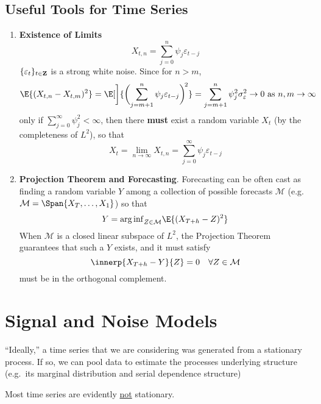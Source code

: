 \subsection*{Useful Tools for Time Series}
\begin{enumerate}[(1)]
    \item \textbf{Existence of Limits}
          \[ X_{t,n}=\sum_{j=0}^{n} \psi_j \varepsilon_{t-j}
          \]
          $ \{\varepsilon_t\}_{t\in\mathbf{Z}} $ is a strong white noise.
          Since for $ n>m $,
          \[ \E{(X_{t,n}-X_{t,m})^2}
              =\E[\bigg]{\biggl(\sum_{j=m+1}^{n} \psi_j \varepsilon_{t-j}\biggr)^{\!2}}
              =\sum_{j=m+1}^{n} \psi_j^2\sigma_{\varepsilon}^2\to 0\text{ as }
              n,m\to \infty \]
          only if $ \sum_{j=0}^{\infty} \psi_j^2<\infty $, then there \textbf{must}
          exist a random variable $ X_t $ (by the completeness of $ L^2 $), so that
          \[ X_t=\lim\limits_{{n} \to {\infty}} X_{t,n}=\sum_{j=0}^{\infty}
              \psi_j \varepsilon_{t-j} \]
    \item \textbf{Projection Theorem and Forecasting}.
          Forecasting can be often cast as finding a random variable $ Y $ among
          a collection of possible forecasts $ \mathcal{M} $ (e.g.
          $ \mathcal{M}=\Span{X_T,\ldots,X_1} $) so that
          \[ Y={\arg\inf}_{Z\in\mathcal{M}}\E{(X_{T+h}-Z)^2} \]
          When $ \mathcal{M} $ is a closed linear subspace of $ L^2 $,
          the Projection Theorem guarantees that such a $ Y $ exists,
          and it must satisfy
          \[ \innerp{X_{T+h}-Y}{Z}=0\quad\forall Z\in\mathcal{M} \]
          must be in the orthogonal complement.
\end{enumerate}

\section{Signal and Noise Models}
``Ideally,'' a time series that we are considering
was generated from a stationary process. If so,
we can pool data to estimate the processes underlying structure
(e.g.\ its marginal distribution and serial dependence structure)

Most time series are evidently \underline{not} stationary.

